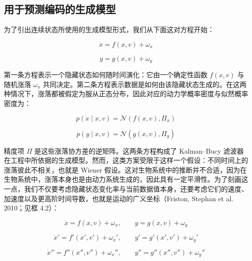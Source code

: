 \subsection{用于预测编码的生成模型}

为了引出连续状态所使用的生成模型形式，我们从下面这对方程开始：

\begin{equation}
\dot{x} = f(x, v) + \omega_x
\tag{4.15}
\end{equation}

\begin{equation}
y = g(x, v) + \omega_y
\tag{4.15}
\end{equation}

第一条方程表示一个隐藏状态如何随时间演化：它由一个确定性函数 $f(x,v)$ 与随机涨落 $\omega_x$ 共同决定。第二条方程表示数据是如何由该隐藏状态生成的。在这两种情况下，涨落都被假定为服从正态分布，因此对应的动力学概率密度与似然概率密度为：

\begin{equation}
p(\dot{x} \mid x, v) = \mathcal{N}(f(x, v), \Pi_x)
\tag{4.16}
\end{equation}

\begin{equation}
p(y \mid x, v) = \mathcal{N}(g(x, v), \Pi_y)
\tag{4.16}
\end{equation}

精度项 $\Pi$ 是这些涨落协方差的逆矩阵。这两条方程构成了 Kalman--Bucy 滤波器在工程中所依据的生成模型。然而，这类方案受限于这样一个假设：不同时间上的涨落彼此不相关，也就是 Wiener 假设。这对生物系统中的推断并不合适，因为在生物系统中，涨落本身也是由动力系统生成的，因此具有一定平滑性。为了刻画这一点，我们不仅要考虑隐藏状态变化率与当前数据值本身，还要考虑它们的速度、加速度以及更高阶时间导数，也就是运动的广义坐标（Friston, Stephan et al. 2010；见框 4.2）：

\begin{equation}
\dot{x} = f(x, v) + \omega_x, \qquad y = g(x, v) + \omega_y
\tag{4.17}
\end{equation}

\begin{equation}
\dot{x}' = f'(x', v') + \omega_{x}', \qquad y' = g'(x', v') + \omega_{y}'
\tag{4.17}
\end{equation}

\begin{equation}
\dot{x}'' = f''(x'', v'') + \omega_{x}'', \qquad y'' = g''(x'', v'') + \omega_{y}''
\tag{4.17}
\end{equation}

